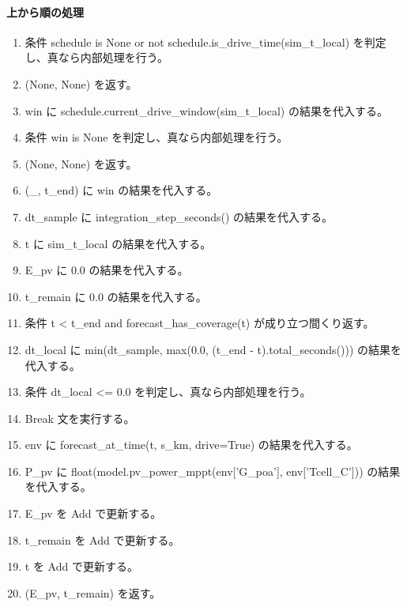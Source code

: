 \documentclass[a4paper,11pt]{article}
\begin{document}
            \paragraph{上から順の処理}
            \begin{enumerate}[leftmargin=1.8em]
            \item 条件 schedule is None or not schedule.is\_drive\_time(sim\_t\_local) を判定し、真なら内部処理を行う。
\item   (None, None) を返す。
\item win に schedule.current\_drive\_window(sim\_t\_local) の結果を代入する。
\item 条件 win is None を判定し、真なら内部処理を行う。
\item   (None, None) を返す。
\item (\_, t\_end) に win の結果を代入する。
\item dt\_sample に integration\_step\_seconds() の結果を代入する。
\item t に sim\_t\_local の結果を代入する。
\item E\_pv に 0.0 の結果を代入する。
\item t\_remain に 0.0 の結果を代入する。
\item 条件 t < t\_end and forecast\_has\_coverage(t) が成り立つ間くり返す。
\item   dt\_local に min(dt\_sample, max(0.0, (t\_end - t).total\_seconds())) の結果を代入する。
\item   条件 dt\_local <= 0.0 を判定し、真なら内部処理を行う。
\item     Break 文を実行する。
\item   env に forecast\_at\_time(t, s\_km, drive=True) の結果を代入する。
\item   P\_pv に float(model.pv\_power\_mppt(env['G\_poa'], env['Tcell\_C'])) の結果を代入する。
\item   E\_pv を Add で更新する。
\item   t\_remain を Add で更新する。
\item   t を Add で更新する。
\item (E\_pv, t\_remain) を返す。
            \end{enumerate}
\end{document}
